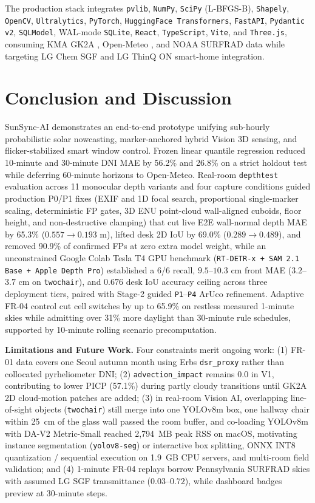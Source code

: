 \documentclass[conference]{IEEEtran}
\begin{document}
The production stack integrates \texttt{pvlib}, \texttt{NumPy}, \texttt{SciPy} (L-BFGS-B), \texttt{Shapely}, \texttt{OpenCV}, \texttt{Ultralytics}, \texttt{PyTorch}, \texttt{HuggingFace Transformers}, \texttt{FastAPI}, \texttt{Pydantic v2}, \texttt{SQLModel}, WAL-mode \texttt{SQLite}, \texttt{React}, \texttt{TypeScript}, \texttt{Vite}, and \texttt{Three.js}, consuming KMA GK2A \cite{b8}, Open-Meteo \cite{b9}, and NOAA SURFRAD \cite{b10} data while targeting LG Chem SGF and LG ThinQ ON smart-home integration.

\section{Conclusion and Discussion}

SunSync-AI demonstrates an end-to-end prototype unifying sub-hourly probabilistic solar nowcasting, marker-anchored hybrid Vision 3D sensing, and flicker-stabilized smart window control. Frozen linear quantile regression reduced 10-minute and 30-minute DNI MAE by 56.2\% and 26.8\% on a strict holdout test while deferring 60-minute horizons to Open-Meteo. Real-room \texttt{depthtest} evaluation across 11 monocular depth variants and four capture conditions guided production P0/P1 fixes (EXIF and 1D focal search, proportional single-marker scaling, deterministic FP gates, 3D ENU point-cloud wall-aligned cuboids, floor height, and non-destructive clamping) that cut live E2E wall-normal depth MAE by 65.3\% ($0.557\to 0.193\text{ m}$), lifted desk 2D IoU by 69.0\% ($0.289\to 0.489$), and removed 90.9\% of confirmed FPs at zero extra model weight, while an unconstrained Google Colab Tesla T4 GPU benchmark (\texttt{RT-DETR-x + SAM 2.1 Base + Apple Depth Pro}) established a 6/6 recall, $9.5$--$10.3\text{ cm}$ front MAE ($3.2$--$3.7\text{ cm}$ on \texttt{twochair}), and $0.676$ desk IoU accuracy ceiling across three deployment tiers, paired with Stage-2 guided \texttt{P1}--\texttt{P4} ArUco refinement. Adaptive FR-04 control cut cell switches by up to 65.9\% on restless measured 1-minute skies while admitting over 31\% more daylight than 30-minute rule schedules, supported by 10-minute rolling scenario precomputation.

\textbf{Limitations and Future Work.} Four constraints merit ongoing work: (1) FR-01 data covers one Seoul autumn month using Erbs \texttt{dsr\_proxy} rather than collocated pyrheliometer DNI; (2) \texttt{advection\_impact} remains $0.0$ in V1, contributing to lower PICP (57.1\%) during partly cloudy transitions until GK2A 2D cloud-motion patches are added; (3) in real-room Vision AI, overlapping line-of-sight objects (\texttt{twochair}) still merge into one YOLOv8m box, one hallway chair within 25~cm of the glass wall passed the room buffer, and co-loading YOLOv8m with DA-V2 Metric-Small reached 2,794~MB peak RSS on macOS, motivating instance segmentation (\texttt{yolov8-seg}) or interactive box splitting, ONNX INT8 quantization / sequential execution on 1.9~GB CPU servers, and multi-room field validation; and (4) 1-minute FR-04 replays borrow Pennsylvania SURFRAD skies with assumed LG SGF transmittance ($0.03$--$0.72$), while dashboard badges preview at 30-minute steps.
\end{document}
